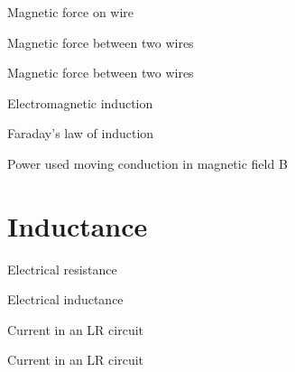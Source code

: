 \documentclass[compress]{beamer}
\begin{document}
{
    \begin{frame}{Magnetic force on wire}
    \end{frame}
}

{
    \begin{frame}{Magnetic force between two wires}
    \end{frame}
}

{
    \begin{frame}{Magnetic force between two wires}
    \end{frame}
}

{
    \begin{frame}{Electromagnetic induction}
    \end{frame}
}

{
    \begin{frame}{Faraday's law of induction}
    \end{frame}
}

{
    \begin{frame}{Power used moving conduction in magnetic field B}
    \end{frame}
}

\section{Inductance}

{
    \begin{frame}{Electrical resistance}
    \end{frame}
}

{
    \begin{frame}{Electrical inductance}
    \end{frame}
}

{
    \begin{frame}{Current in an LR circuit}
    \end{frame}
}

{
    \begin{frame}{Current in an LR circuit}
    \end{frame}
}
\end{document}
